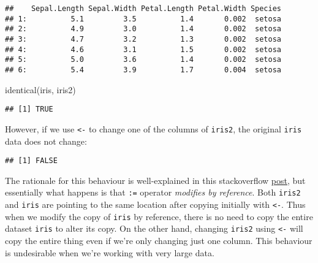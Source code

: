 \documentclass[
]{book}
\newenvironment{Shaded}{\begin{snugshade}}{\end{snugshade}}
\newcommand{\DecValTok}[1]{\textcolor[rgb]{0.00,0.00,0.81}{#1}}
\newcommand{\FunctionTok}[1]{\textcolor[rgb]{0.00,0.00,0.00}{#1}}
\newcommand{\NormalTok}[1]{#1}
\newcommand{\OtherTok}[1]{\textcolor[rgb]{0.56,0.35,0.01}{#1}}
\newcommand{\SpecialCharTok}[1]{\textcolor[rgb]{0.00,0.00,0.00}{#1}}
\begin{document}
\begin{verbatim}
##    Sepal.Length Sepal.Width Petal.Length Petal.Width Species
## 1:          5.1         3.5          1.4       0.002  setosa
## 2:          4.9         3.0          1.4       0.002  setosa
## 3:          4.7         3.2          1.3       0.002  setosa
## 4:          4.6         3.1          1.5       0.002  setosa
## 5:          5.0         3.6          1.4       0.002  setosa
## 6:          5.4         3.9          1.7       0.004  setosa
\end{verbatim}

\begin{Shaded}
\begin{Highlighting}[]
\FunctionTok{identical}\NormalTok{(iris, iris2)}
\end{Highlighting}
\end{Shaded}

\begin{verbatim}
## [1] TRUE
\end{verbatim}

However, if we use \texttt{\textless{}-} to change one of the columns of \texttt{iris2}, the original \texttt{iris} data does not change:

\begin{Shaded}
\end{Shaded}

\begin{verbatim}
## [1] FALSE
\end{verbatim}

The rationale for this behaviour is well-explained in this stackoverflow \href{https://stackoverflow.com/questions/10225098/understanding-exactly-when-a-data-table-is-a-reference-to-vs-a-copy-of-another}{post}, but essentially what happens is that \texttt{:=} operator \emph{modifies by reference}. Both \texttt{iris2} and \texttt{iris} are pointing to the same location after copying initially with \texttt{\textless{}-}. Thus when we modify the copy of \texttt{iris} by reference, there is no need to copy the entire dataset \texttt{iris} to alter its copy. On the other hand, changing \texttt{iris2} using \texttt{\textless{}-} will copy the entire thing even if we're only changing just one column. This behaviour is undesirable when we're working with very large data.
\end{document}
